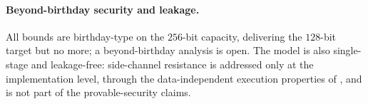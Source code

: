 \paragraph{Beyond-birthday security and leakage.}
All bounds are birthday-type on the $256$-bit capacity, delivering the
$128$-bit target but no more; a beyond-birthday analysis is open. The model is
also single-stage and leakage-free: side-channel resistance is addressed only at
the implementation level, through the data-independent execution properties of
, and is not part of the provable-security claims.
